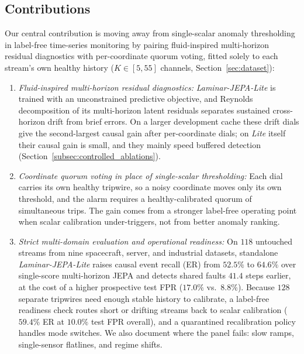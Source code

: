 \subsection{Contributions}
Our central contribution is moving away from single-scalar anomaly thresholding in label-free time-series monitoring by pairing fluid-inspired multi-horizon residual diagnostics with per-coordinate quorum voting, fitted solely to each stream's own healthy history ($K\in[5,55]$ channels, Section~\ref{sec:dataset}):
\begin{enumerate}[leftmargin=*, nosep, itemsep=1pt]
    \item \emph{Fluid-inspired multi-horizon residual diagnostics:} \emph{Laminar-JEPA-Lite} is trained with an unconstrained predictive objective, and Reynolds decomposition of its multi-horizon latent residuals separates sustained cross-horizon drift from brief errors. On a larger development cache these drift dials give the second-largest causal gain after per-coordinate dials; on \emph{Lite} itself their causal gain is small, and they mainly speed buffered detection (Section~\ref{subsec:controlled_ablations}).
    \item \emph{Coordinate quorum voting in place of single-scalar thresholding:} Each dial carries its own healthy tripwire, so a noisy coordinate moves only its own threshold, and the alarm requires a healthy-calibrated quorum of simultaneous trips. The gain comes from a stronger label-free operating point when scalar calibration under-triggers, not from better anomaly ranking.
    \item \emph{Strict multi-domain evaluation and operational readiness:} On $118$ untouched streams from nine spacecraft, server, and industrial datasets, standalone \emph{Laminar-JEPA-Lite} raises causal event recall (ER) from $52.5\%$ to $64.6\%$ over single-score multi-horizon JEPA and detects shared faults $41.4$ steps earlier, at the cost of a higher prospective test FPR ($17.0\%$ vs.\ $8.8\%$). Because $128$ separate tripwires need enough stable history to calibrate, a label-free readiness check routes short or drifting streams back to scalar calibration ($59.4\%$ ER at $10.0\%$ test FPR overall), and a quarantined recalibration policy handles mode switches. We also document where the panel fails: slow ramps, single-sensor flatlines, and regime shifts.
\end{enumerate}

